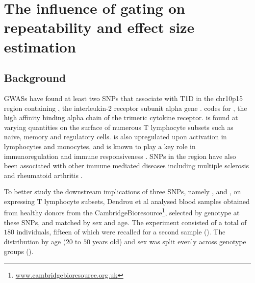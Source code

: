 \chapter{ \label{chapter:il2ra} The influence of gating on repeatability and effect size estimation }

\section{Background}

\Glspl{GWAS} have found at least two \glspl{SNP} that associate with T1D in the chr10p15 region containing 
, the interleukin-2 receptor subunit alpha gene \citep{Lowe:2007ij}.
 codes for , the high affinity binding alpha chain of the trimeric  cytokine receptor.  
 is found at varying quantities on the surface of numerous T lymphocyte subsets such as naive, memory and
regulatory cells.
 is also upregulated upon activation in lymphocytes and monocytes, 
and is known to play a key role in immunoregulation and immune responsiveness \citep{Brusko:2009bn,Boyman:2012cy}.  
SNPs in the  region have also been associated with other immune mediated diseases including multiple sclerosis \citep{Beecham:2013hh} and rheumatoid arthritis \citep{Stahl:2010dy}.

To better study the downstream implications of three  SNPs, namely ,  and ,
on  expressing T lymphocyte subsets, Dendrou et al
analysed blood samples obtained from healthy donors from the CambridgeBioresource\footnote{\url{www.cambridgebioresource.org.uk}},
selected by genotype at these SNPs, and matched by sex and age.
The experiment consisted of a total of $180$ individuals, fifteen of which were recalled for a second sample ().
The distribution by age ($20$ to $50$ years old) and sex was split evenly across genotype groups ().


